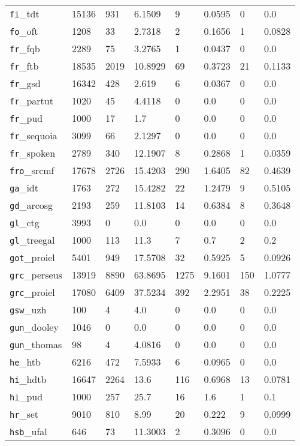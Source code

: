 \begin{longtable}{|l|l|l|l|l|l|l|l|}
\texttt{fi}\_tdt & 15136 & 931 & 6.1509 & 9 & 0.0595 & 0 & 0.0\\
\texttt{fo}\_oft & 1208 & 33 & 2.7318 & 2 & 0.1656 & 1 & 0.0828\\
\texttt{fr}\_fqb & 2289 & 75 & 3.2765 & 1 & 0.0437 & 0 & 0.0\\
\texttt{fr}\_ftb & 18535 & 2019 & 10.8929 & 69 & 0.3723 & 21 & 0.1133\\
\texttt{fr}\_gsd & 16342 & 428 & 2.619 & 6 & 0.0367 & 0 & 0.0\\
\texttt{fr}\_partut & 1020 & 45 & 4.4118 & 0 & 0.0 & 0 & 0.0\\
\texttt{fr}\_pud & 1000 & 17 & 1.7 & 0 & 0.0 & 0 & 0.0\\
\texttt{fr}\_sequoia & 3099 & 66 & 2.1297 & 0 & 0.0 & 0 & 0.0\\
\texttt{fr}\_spoken & 2789 & 340 & 12.1907 & 8 & 0.2868 & 1 & 0.0359\\
\texttt{fro}\_srcmf & 17678 & 2726 & 15.4203 & 290 & 1.6405 & 82 & 0.4639\\
\texttt{ga}\_idt & 1763 & 272 & 15.4282 & 22 & 1.2479 & 9 & 0.5105\\
\texttt{gd}\_arcosg & 2193 & 259 & 11.8103 & 14 & 0.6384 & 8 & 0.3648\\
\texttt{gl}\_ctg & 3993 & 0 & 0.0 & 0 & 0.0 & 0 & 0.0\\
\texttt{gl}\_treegal & 1000 & 113 & 11.3 & 7 & 0.7 & 2 & 0.2\\
\texttt{got}\_proiel & 5401 & 949 & 17.5708 & 32 & 0.5925 & 5 & 0.0926\\
\texttt{grc}\_perseus & 13919 & 8890 & 63.8695 & 1275 & 9.1601 & 150 & 1.0777\\
\texttt{grc}\_proiel & 17080 & 6409 & 37.5234 & 392 & 2.2951 & 38 & 0.2225\\
\texttt{gsw}\_uzh & 100 & 4 & 4.0 & 0 & 0.0 & 0 & 0.0\\
\texttt{gun}\_dooley & 1046 & 0 & 0.0 & 0 & 0.0 & 0 & 0.0\\
\texttt{gun}\_thomas & 98 & 4 & 4.0816 & 0 & 0.0 & 0 & 0.0\\
\texttt{he}\_htb & 6216 & 472 & 7.5933 & 6 & 0.0965 & 0 & 0.0\\
\texttt{hi}\_hdtb & 16647 & 2264 & 13.6 & 116 & 0.6968 & 13 & 0.0781\\
\texttt{hi}\_pud & 1000 & 257 & 25.7 & 16 & 1.6 & 1 & 0.1\\
\texttt{hr}\_set & 9010 & 810 & 8.99 & 20 & 0.222 & 9 & 0.0999\\
\texttt{hsb}\_ufal & 646 & 73 & 11.3003 & 2 & 0.3096 & 0 & 0.0\\

\end{longtable}
